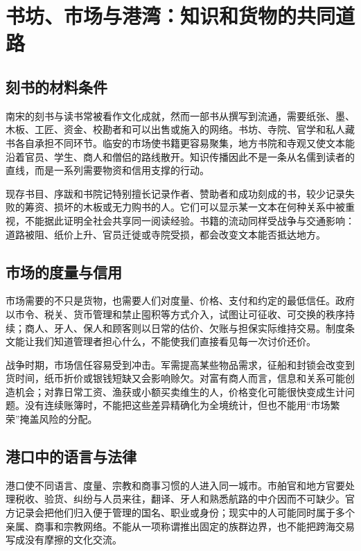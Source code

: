 \section{书坊、市场与港湾：知识和货物的共同道路}

\subsection{刻书的材料条件}

南宋的刻书与读书常被看作文化成就，然而一部书从撰写到流通，需要纸张、墨、木板、工匠、资金、校勘者和可以出售或施入的网络。书坊、寺院、官学和私人藏书各自承担不同环节。临安的市场使书籍更容易聚集，地方书院和寺观又使文本能沿着官员、学生、商人和僧侣的路线散开。知识传播因此不是一条从名儒到读者的直线，而是一系列需要物资和信用支撑的行动。

现存书目、序跋和书院记特别擅长记录作者、赞助者和成功刻成的书，较少记录失败的筹资、损坏的木板或无力购书的人。它们可以显示某一文本在何种关系中被重视，不能据此证明全社会共享同一阅读经验。书籍的流动同样受战争与交通影响：道路被阻、纸价上升、官员迁徙或寺院受损，都会改变文本能否抵达地方。

\subsection{市场的度量与信用}

市场需要的不只是货物，也需要人们对度量、价格、支付和约定的最低信任。政府以市令、税关、货币管理和禁止囤积等方式介入，试图让可征收、可交换的秩序持续；商人、牙人、保人和顾客则以日常的估价、欠账与担保实际维持交易。制度条文能让我们知道管理者担心什么，不能使我们直接看见每一次讨价还价。

战争时期，市场信任容易受到冲击。军需提高某些物品需求，征船和封锁会改变到货时间，纸币折价或银钱短缺又会影响赊欠。对富有商人而言，信息和关系可能创造机会；对靠日常工资、渔获或小额买卖维生的人，价格变化可能很快变成生计问题。没有连续账簿时，不能把这些差异精确化为全境统计，但也不能用“市场繁荣”掩盖风险的分配。

\subsection{港口中的语言与法律}

港口使不同语言、度量、宗教和商事习惯的人进入同一城市。市舶官和地方官要处理税收、验货、纠纷与人员来往，翻译、牙人和熟悉航路的中介因而不可缺少。官方记录会把他们归入便于管理的国名、职业或身份；现实中的人可能同时属于多个亲属、商事和宗教网络。不能从一项称谓推出固定的族群边界，也不能把跨海交易写成没有摩擦的文化交流。

